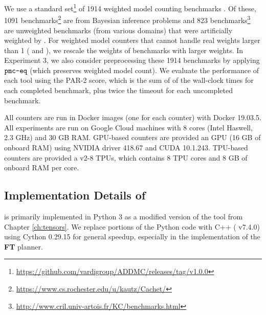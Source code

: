 We use a standard set\footnote{\url{https://github.com/vardigroup/ADDMC/releases/tag/v1.0.0}} of 1914 weighted model counting benchmarks \cite{DPV20}. Of these, 1091 benchmarks\footnote{\url{https://www.cs.rochester.edu/u/kautz/Cachet/}} are from Bayesian inference problems \cite{SBK05} and 823 benchmarks\footnote{\url{http://www.cril.univ-artois.fr/KC/benchmarks.html}} are unweighted benchmarks (from various domains) that were artificially weighted by \cite{DPV20}. For weighted model counters that cannot handle real weights larger than 1 ( and ), we rescale the weights of benchmarks with larger weights. In Experiment 3, we also consider preprocessing these 1914 benchmarks by applying $\texttt{\upshape pmc-eq}$ \cite{LM14} (which preserves weighted model count). %
We evaluate the performance of each tool using the PAR-2 score, which is the sum of of the wall-clock times for each completed benchmark, plus twice the timeout for each uncompleted benchmark.

All counters are run in Docker images (one for each counter) with Docker 19.03.5. All experiments are run on Google Cloud  machines with 8 cores (Intel Haswell, 2.3 GHz) and 30 GB RAM. GPU-based counters are provided an  GPU (16 GB of onboard RAM) using NVIDIA driver 418.67 and CUDA 10.1.243. TPU-based counters are provided a v2-8 TPUs, which contains 8 TPU cores and 8 GB of onboard RAM per core.

\subsection{Implementation Details of }
\label{sec:experiments:impl}
 is primarily implemented in Python 3 as a modified version of the tool  from Chapter \ref{ch:tensors}. We replace portions of the Python code with C++ ( v7.4.0) using Cython 0.29.15 for general speedup, especially in the implementation of the \textbf{FT} planner.


